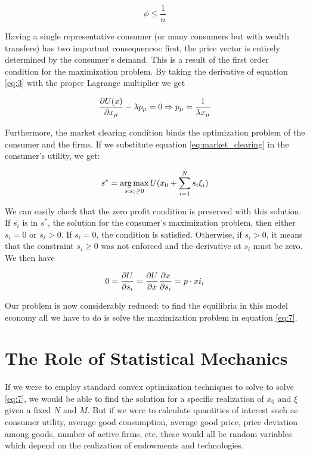 \begin{equation}
  \label{eq:phi_max}
  \phi \leq \frac{1}{n}
\end{equation}

Having a single representative consumer (or
many consumers but with wealth transfers) has two important
consequences: first, the price vector is entirely determined by the
consumer's demand. This is a result of the first order condition for
the maximization problem. By taking the derivative of equation
\eqref{eq:3} with the proper Lagrange multiplier we get

\begin{equation}
  \label{eq:8}
  \frac{\partial U(x)}{\partial x_\mu} - \lambda p_\mu = 0 \Rightarrow p_\mu =
  \frac{1}{\lambda x_\mu}
\end{equation}

Furthermore, the market clearing condition binds the optimization
problem of the consumer and the firms. If we substitute equation
\eqref{eq:market_clearing} in the consumer's utility, we get:

\begin{equation}
  \label{eq:7}
  s^\ast = \operatorname*{arg\,max}_{s : s_i \geq 0} U(x_0 + \sum_{i=1}^N s_i \xi_i)
\end{equation}

We can easily check that the zero profit condition is preserved with
this solution. If $s_i$ is in $s^\ast$, the solution for the
consumer's maximization problem, then either $s_i = 0$ or $s_i >
0$. If $s_i = 0$, the condition is satisfied. Otherwise, if $s_i > 0$,
it means that the constraint $s_i \geq 0$ was not enforced and the
derivative at $s_i$ must be zero. We then have

\begin{equation}
  \label{eq:9}
  0 = \frac{\partial U}{\partial s_i} = \frac{\partial U}{\partial x} \frac{\partial
    x}{\partial s_i} = p\cdot xi_i
\end{equation}

Our problem is now considerably reduced: to find the equilibria in
this model economy all we have to do is solve the maximization problem
in equation \eqref{eq:7}.


\section{The Role of Statistical Mechanics} \label{sec:rle_statmech}

If we were to employ standard convex optimization techniques to solve
to solve \eqref{eq:7}, we would be able to find the solution for a
specific realization of $x_0$ and $\xi$ given a fixed $N$ and $M$. But
if we were to calculate quantities of interest such as consumer
utility, average good consumption, average good price, price deviation
among goods, number of active firms, etc, these would all be random
variables which depend on the realization of endowments and
technologies.

